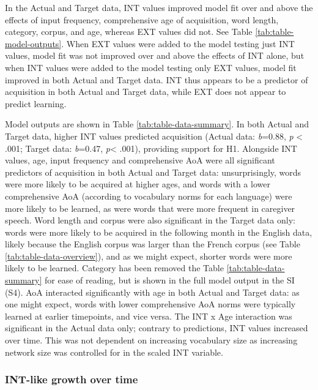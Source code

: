 \documentclass[
  man]{apa6}
\begin{document}
In the Actual and Target data, INT values improved model fit over and above the effects of input frequency, comprehensive age of acquisition, word length, category, corpus, and age, whereas EXT values did not. See Table \ref{tab:table-model-outputs}. When EXT values were added to the model testing just INT values, model fit was not improved over and above the effects of INT alone, but when INT values were added to the model testing only EXT values, model fit improved in both Actual and Target data. INT thus appears to be a predictor of acquisition in both Actual and Target data, while EXT does not appear to predict learning.

Model outputs are shown in Table \ref{tab:table-data-summary}. In both Actual and Target data, higher INT values predicted acquisition (Actual data: \emph{b}=0.88, \emph{p} \textless{} .001; Target data: \emph{b}=0.47, \emph{p}\textless{} .001), providing support for H1. Alongside INT values, age, input frequency and comprehensive AoA were all significant predictors of acquisition in both Actual and Target data: unsurprisingly, words were more likely to be acquired at higher ages, and words with a lower comprehensive AoA (according to vocabulary norms for each language) were more likely to be learned, as were words that were more frequent in caregiver speech. Word length and corpus were also significant in the Target data only: words were more likely to be acquired in the following month in the English data, likely because the English corpus was larger than the French corpus (see Table \ref{tab:table-data-overview}), and as we might expect, shorter words were more likely to be learned. Category has been removed the Table \ref{tab:table-data-summary} for ease of reading, but is shown in the full model output in the SI (S4). AoA interacted significantly with age in both Actual and Target data: as one might expect, words with lower comprehensive AoA norms were typically learned at earlier timepoints, and vice versa. The INT x Age interaction was significant in the Actual data only; contrary to predictions, INT values increased over time. This was not dependent on increasing vocabulary size as increasing network size was controlled for in the scaled INT variable.

\hypertarget{int-like-growth-over-time}{%
\subsubsection{INT-like growth over time}\label{int-like-growth-over-time}}
\end{document}
